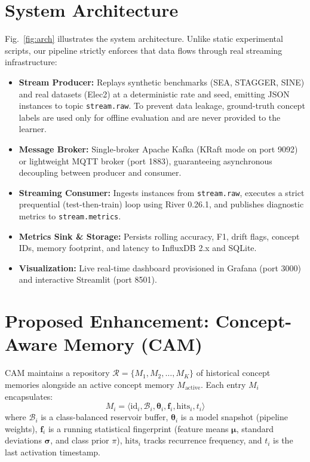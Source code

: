 \documentclass[conference]{IEEEtran}
\begin{document}
\section{System Architecture}
Fig.~\ref{fig:arch} illustrates the system architecture. Unlike static experimental scripts, our pipeline strictly enforces that data flows through real streaming infrastructure:
\begin{itemize}
    \item \textbf{Stream Producer:} Replays synthetic benchmarks (SEA, STAGGER, SINE) and real datasets (Elec2) at a deterministic rate and seed, emitting JSON instances to topic \texttt{stream.raw}. To prevent data leakage, ground-truth concept labels are used only for offline evaluation and are never provided to the learner.
    \item \textbf{Message Broker:} Single-broker Apache Kafka (KRaft mode on port 9092) or lightweight MQTT broker (port 1883), guaranteeing asynchronous decoupling between producer and consumer.
    \item \textbf{Streaming Consumer:} Ingests instances from \texttt{stream.raw}, executes a strict prequential (test-then-train) loop using River 0.26.1, and publishes diagnostic metrics to \texttt{stream.metrics}.
    \item \textbf{Metrics Sink \& Storage:} Persists rolling accuracy, F1, drift flags, concept IDs, memory footprint, and latency to InfluxDB 2.x and SQLite.
    \item \textbf{Visualization:} Live real-time dashboard provisioned in Grafana (port 3000) and interactive Streamlit (port 8501).
\end{itemize}

\section{Proposed Enhancement: Concept-Aware Memory (CAM)}
CAM maintains a repository $\mathcal{R} = \{M_1, M_2, \dots, M_K\}$ of historical concept memories alongside an active concept memory $M_{\text{active}}$. Each entry $M_i$ encapsulates:
\begin{equation}
M_i = \langle \text{id}_i, \mathcal{B}_i, \boldsymbol{\theta}_i, \mathbf{f}_i, \text{hits}_i, t_i \rangle
\end{equation}
where $\mathcal{B}_i$ is a class-balanced reservoir buffer, $\boldsymbol{\theta}_i$ is a model snapshot (pipeline weights), $\mathbf{f}_i$ is a running statistical fingerprint (feature means $\boldsymbol{\mu}$, standard deviations $\boldsymbol{\sigma}$, and class prior $\pi$), $\text{hits}_i$ tracks recurrence frequency, and $t_i$ is the last activation timestamp.
\end{document}

